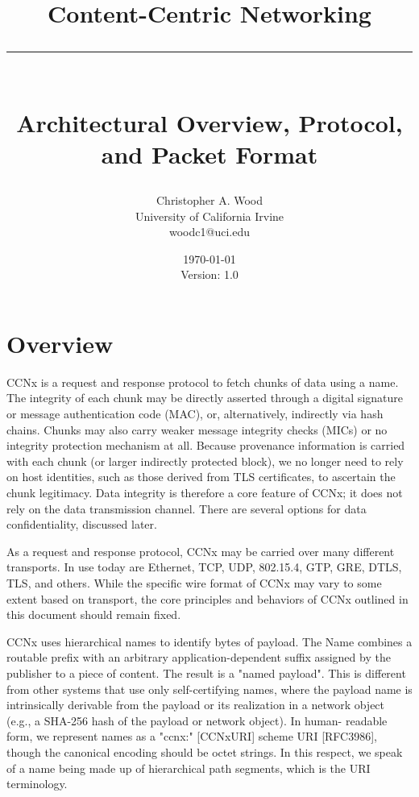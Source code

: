 \documentclass[12pt]{report}
\newcommand{\HRule}[1]{\rule{\linewidth}{#1}}
\begin{document}
\title{ \LARGE \textbf{Content-Centric Networking}
        \HRule{2pt} \\ [0.5cm]
        \large Architectural Overview, Protocol, and Packet Format}

\date{\today \\ Version: 1.0}

\author{
        Christopher A. Wood \\
        University of California Irvine \\
        woodc1@uci.edu }

\maketitle
\tableofcontents
\newpage


\section{Overview}
CCNx is a request and response protocol to fetch chunks of data using
a name.  The integrity of each chunk may be directly asserted through
a digital signature or message authentication code (MAC), or,
alternatively, indirectly via hash chains.  Chunks may also carry
weaker message integrity checks (MICs) or no integrity protection
mechanism at all.  Because provenance information is carried with
each chunk (or larger indirectly protected block), we no longer need
to rely on host identities, such as those derived from TLS
certificates, to ascertain the chunk legitimacy.  Data integrity is
therefore a core feature of CCNx; it does not rely on the data
transmission channel.  There are several options for data
confidentiality, discussed later.

As a request and response protocol, CCNx may be carried over many
different transports.  In use today are Ethernet, TCP, UDP, 802.15.4,
GTP, GRE, DTLS, TLS, and others.  While the specific wire format of
CCNx may vary to some extent based on transport, the core principles
and behaviors of CCNx outlined in this document should remain fixed.

CCNx uses hierarchical names to identify bytes of payload.  The Name
combines a routable prefix with an arbitrary application-dependent
suffix assigned by the publisher to a piece of content.  The result
is a "named payload".  This is different from other systems that use
only self-certifying names, where the payload name is intrinsically
derivable from the payload or its realization in a network object
(e.g., a SHA-256 hash of the payload or network object).  In human-
readable form, we represent names as a "ccnx:" [CCNxURI] scheme URI
[RFC3986], though the canonical encoding should be octet strings.  In
this respect, we speak of a name being made up of hierarchical path
segments, which is the URI terminology.
\end{document}
